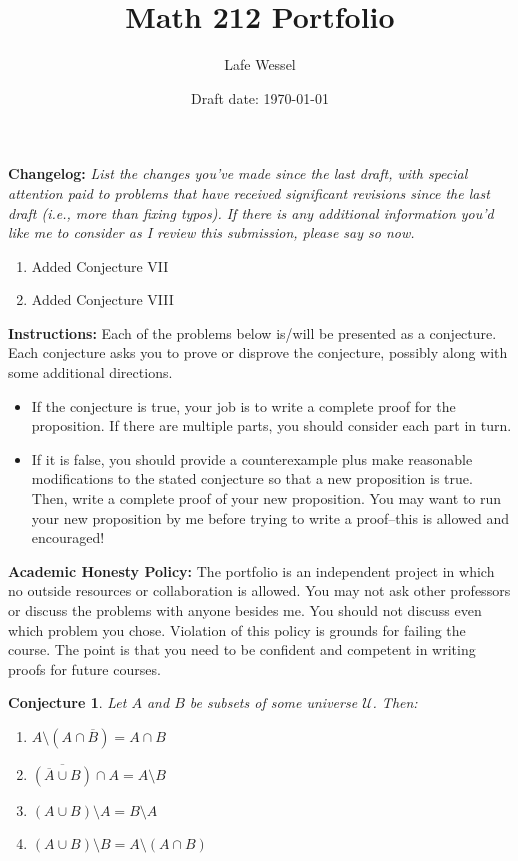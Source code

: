 \documentclass[11pt,titlepage]{article}		%
\title{\sc Math 212 Portfolio}
\author{Lafe Wessel}
\date{Draft date: \today}
\theoremstyle{theorem}
\newtheorem{conjecture}[theorem]{Conjecture}
\begin{document}
\maketitle


\noindent\textbf{Changelog:} \emph{List the changes you've made since the last draft, with special attention paid to problems that have received significant revisions since the last draft (i.e., more than fixing typos). If there is any additional information you'd like me to consider as I review this submission, please say so now.}

\begin{enumerate}
\item Added Conjecture VII
\item Added Conjecture VIII
\end{enumerate}

\noindent\textbf{Instructions:} Each of the problems below is/will be presented as a conjecture. Each conjecture asks you to prove or disprove the conjecture, possibly along with some additional directions. 

\bigskip

\begin{itemize}  
	\item If the conjecture is true, your job is to write a complete proof for the proposition. If there are multiple parts, you should consider each part in turn.
	\item If it is false, you should provide a counterexample plus make reasonable modifications to the stated conjecture so that a new proposition is true. Then, write a complete proof of your new proposition. You may want to run your new proposition by me before trying to write a proof--this is allowed and encouraged!
\end{itemize}


\noindent\textbf{Academic Honesty Policy:}
The portfolio is an independent project in which no outside resources or collaboration is allowed. You may not ask other professors or discuss the problems with anyone besides me. You should not discuss even which problem you chose. Violation of this policy is grounds for failing the course. The point is that you need to be confident and competent in writing proofs for future courses.






\clearpage

\begin{conjecture}
	Let $A$ and $B$ be subsets of some universe $\mathcal{U}$.
	Then:
	\begin{enumerate}
		\item $A\setminus (A\cap \overline{B}) = A\cap B$
		\item $\overline{(\overline{A}\cup B)} \cap A = A\setminus B$
		\item $(A\cup B)\setminus A = B\setminus A$
		\item $(A\cup B) \setminus B = A\setminus (A\cap B)$
	\end{enumerate}
\end{conjecture}
\end{document}
